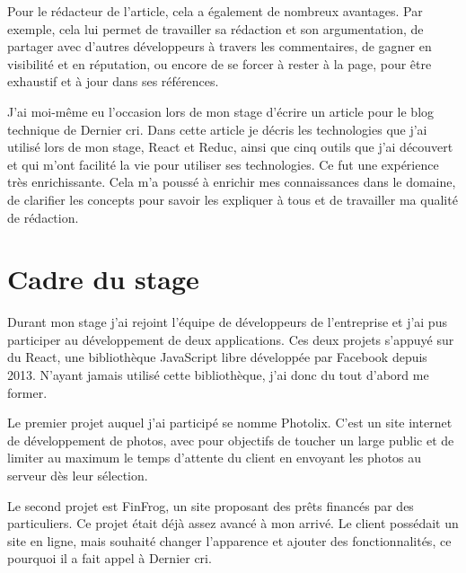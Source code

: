 \documentclass[12pt,a4paper]{article}
\begin{document}
  \bigskip

  Pour le rédacteur de l'article, cela a également de nombreux avantages.
  Par exemple, cela lui permet de travailler sa rédaction et son
  argumentation, de partager avec d'autres développeurs à travers les
  commentaires, de gagner en visibilité et en réputation, ou encore de se
  forcer à rester à la page, pour être exhaustif et à jour dans ses
  références.

  \bigskip

  J'ai moi-même eu l'occasion lors de mon stage d'écrire un article pour
  le blog technique de Dernier cri. Dans cette article je décris les
  technologies que j'ai utilisé lors de mon stage, React et Reduc, ainsi
  que cinq outils que j'ai découvert et qui m'ont facilité la vie pour
  utiliser ses technologies. Ce fut une expérience très enrichissante.
  Cela m'a poussé à enrichir mes connaissances dans le domaine, de
  clarifier les concepts pour savoir les expliquer à tous et de travailler
  ma qualité de rédaction.

  \newpage

  \section{Cadre du stage}\label{cadre-du-stage}

  \bigskip

  Durant mon stage j'ai rejoint l'équipe de développeurs de l'entreprise
  et j'ai pus participer au développement de deux applications. Ces deux
  projets s'appuyé sur du React, une bibliothèque JavaScript libre
  développée par Facebook depuis 2013. N'ayant jamais utilisé cette
  bibliothèque, j'ai donc du tout d'abord me former.

  \bigskip

  Le premier projet auquel j'ai participé se nomme Photolix. C'est un site
  internet de développement de photos, avec pour objectifs de toucher un
  large public et de limiter au maximum le temps d'attente du client en
  envoyant les photos au serveur dès leur sélection.

  \bigskip

  Le second projet est FinFrog, un site proposant des prêts financés par
  des particuliers. Ce projet était déjà assez avancé à mon arrivé. Le
  client possédait un site en ligne, mais souhaité changer l'apparence et
  ajouter des fonctionnalités, ce pourquoi il a fait appel à Dernier cri.

  \bigskip
\end{document}

